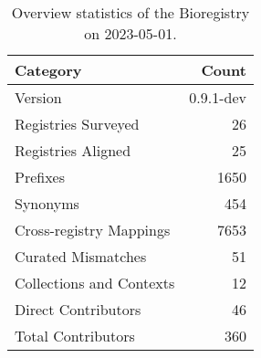 \begin{table}
\caption{Overview statistics of the Bioregistry on 2023-05-01.}
\label{tab:bioregistry-summary}
\begin{tabular}{lr}
\toprule
Category & Count \\
\midrule
Version & 0.9.1-dev \\
Registries Surveyed & 26 \\
Registries Aligned & 25 \\
Prefixes & 1650 \\
Synonyms & 454 \\
Cross-registry Mappings & 7653 \\
Curated Mismatches & 51 \\
Collections and Contexts & 12 \\
Direct Contributors & 46 \\
Total Contributors & 360 \\
\bottomrule
\end{tabular}
\end{table}
